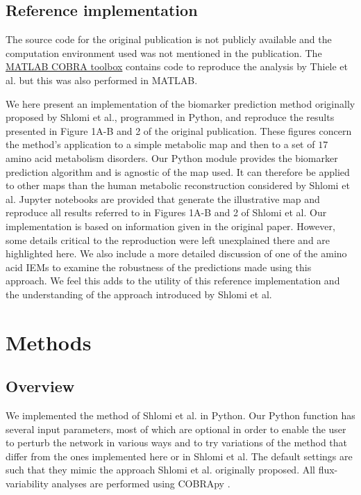 \documentclass[10pt,a4paper,onecolumn]{article}
\begin{document}
\subsection{Reference implementation}\label{reference-implementation}

The source code for the original publication is not publicly available
and the computation environment used was not mentioned in the
publication. The \href{https://github.com/opencobra/cobratoolbox}{MATLAB
COBRA toolbox} contains code to reproduce the analysis by Thiele et al.
but this was also performed in MATLAB.

We here present an implementation of the biomarker prediction method
originally proposed by Shlomi et al., programmed in Python, and
reproduce the results presented in Figure 1A-B and 2 of the original
publication. These figures concern the method's application to a simple
metabolic map and then to a set of \(17\) amino acid metabolism
disorders. Our Python module provides the biomarker prediction algorithm
and is agnostic of the map used. It can therefore be applied to other
maps than the human metabolic reconstruction considered by Shlomi et al.
Jupyter notebooks are provided that generate the illustrative map and
reproduce all results referred to in Figures 1A-B and 2 of Shlomi et al.
Our implementation is based on information given in the original paper.
However, some details critical to the reproduction were left unexplained
there and are highlighted here. We also include a more detailed
discussion of one of the amino acid IEMs to examine the robustness of
the predictions made using this approach. We feel this adds to the
utility of this reference implementation and the understanding of the
approach introduced by Shlomi et al.

\section{Methods}\label{methods}

\subsection{Overview}\label{overview}

We implemented the method of Shlomi et al. in Python. Our Python
function has several input parameters, most of which are optional in
order to enable the user to perturb the network in various ways and to
try variations of the method that differ from the ones implemented here
or in Shlomi et al. The default settings are such that they mimic the
approach Shlomi et al. originally proposed. All flux-variability
analyses are performed using COBRApy \autocite{Ebrahim2013}.
\end{document}
